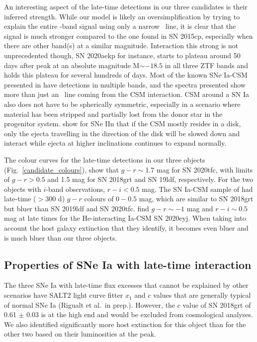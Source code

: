 \documentclass[a4paper,oneside,12pt, class=Latex/Classes/PhDthesisPSnPDF, crop=false]{standalone}
\begin{document}
An interesting aspect of the late-time detections in our three candidates is their inferred strength. While our model is likely an oversimplification by trying to explain the entire \ztfr-band signal using only a narrow \Halpha~line, it is clear that the signal is much stronger compared to the one found in SN 2015cp, especially when there are other band(s) at a similar magnitude. Interaction this strong is not unprecedented though, SN 2020aekp for instance, starts to plateau around 50 days after peak at an absolute magnitude M$\sim-18.5$ in all three ZTF bands \citep{Ia-CSM_BTS} and holds this plateau for several hundreds of days. Most of the known SNe Ia-CSM presented in \citet{Ia-CSM_BTS} have detections in multiple bands, and the spectra presented show more than just an \Halpha~line coming from the CSM interaction. CSM around a SN Ia also does not have to be spherically symmetric, especially in a scenario where material has been stripped and partially lost from the donor star in the progenitor system. \citet{IIn_asym_CSM} show for SNe IIn that if the CSM mostly resides in a disk, only the ejecta travelling in the direction of the disk will be slowed down and interact while ejecta at higher inclinations continues to expand normally. 

The colour curves for the late-time detections in our three objects (Fig.~\ref{candidate_colours}), show that $g - r \sim$1.7 mag for SN 2020tfc, with limits of $g - r > 0.5$ and 1.5 mag for SN 2018grt and SN 19ldf, respectively.
For the two objects with $i$-band observations, $r-i<0.5$ mag. The SN Ia-CSM sample of \cite{Ia-CSM_BTS} had late-time ($>$300 d) $g - r$ colours of $0 - 0.5$ mag, which are similar to SN 2018grt but bluer than SN 2019ldf and SN 2020tfc. \citet{Kool_He_CSM} find $g-r\sim-1$ mag and $r-i\sim0.5$ mag at late times for the He-interacting Ia-CSM SN 2020eyj. When taking into account the host galaxy extinction that they identify, it becomes even bluer and is much bluer than our three objects.


\subsection{Properties of SNe Ia with late-time interaction}
\label{discuss_prop}

The three SNe Ia with late-time flux excesses that cannot be explained by other scenarios have SALT2 light curve fitter $x_1$ and $c$ values that are generally typical of normal SNe Ia (Rigualt et al.~in prep.). However, the $c$ value of SN 2018grt of 0.61 $\pm$ 0.03 is at the high end and would be excluded from cosmological analyses. We also identified significantly more host extinction for this object than for the other two based on their luminosities at the peak. 
\end{document}
